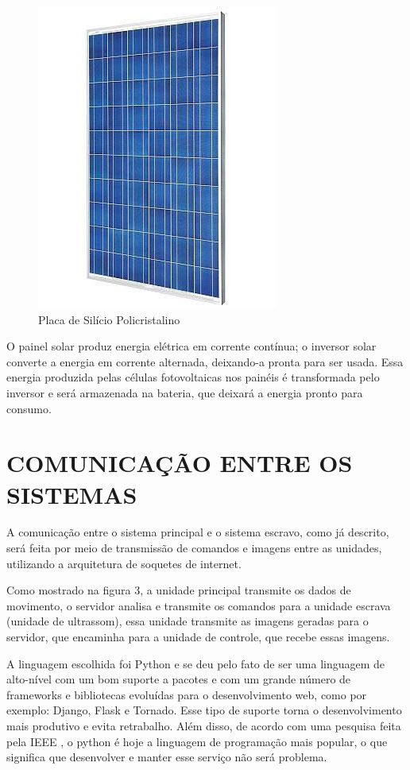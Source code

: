 \begin{figure}[H]
	\centering	\includegraphics[keepaspectratio=true,scale=0.7]{figuras/placafotovoltaica_brasil.jpg}
	\caption{Placa de Silício Policristalino}
	\label{des_fig24}
\end{figure}

O painel solar produz energia elétrica em corrente contínua; o inversor solar converte a energia em corrente alternada, deixando-a pronta para ser usada. Essa energia produzida pelas células fotovoltaicas nos painéis é transformada pelo inversor e será armazenada na bateria, que deixará a energia pronto para consumo.

\section{COMUNICAÇÃO ENTRE OS SISTEMAS}

A comunicação entre o sistema principal e o sistema escravo, como já descrito, será feita por meio de transmissão de comandos e imagens entre as unidades, utilizando a arquitetura de soquetes de internet. 

    Como mostrado na figura 3, a unidade principal transmite os dados de movimento, o servidor analisa e transmite os comandos para a unidade escrava (unidade de ultrassom), essa unidade transmite as imagens geradas para o servidor, que encaminha para a unidade de controle, que recebe essas imagens.
    
    A linguagem escolhida foi Python e se deu pelo fato de ser uma linguagem de alto-nível com um bom suporte a pacotes e com um grande número de frameworks e bibliotecas evoluídas para o desenvolvimento web, como por exemplo: Django, Flask e Tornado. Esse tipo de suporte torna o desenvolvimento mais produtivo e evita retrabalho. Além disso, de acordo com uma pesquisa feita pela IEEE \cite{IEEElang}, o python é hoje a linguagem de programação mais popular, o que significa que desenvolver e manter esse serviço não será problema.
    
